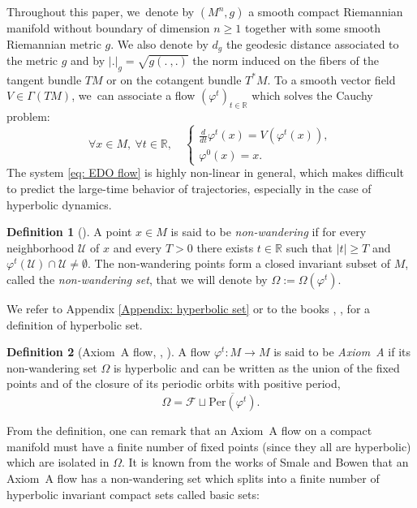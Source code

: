 \documentclass[JEP,XML,SOM,Unicode,NoEqCountersInSection,NoFloatCountersInSection,published]{cedram}
\let\dpl\displaystyle
\theoremstyle{definition}
\newtheorem{definition}{Definition}[section]
\theoremstyle{plain}
\newcommand{\Fcal}{\mathcal{F}}
\newcommand{\R}{\mathbb{R}}
\newcommand{\Ucal}{\mathcal{U}}
\newcommand{\dt}{\frac{d}{dt}}
\begin{document}
Throughout this paper, we~denote by $(M^n,g)$ a smooth compact Riemannian manifold without boundary of dimension $n\geq 1$ together with some smooth Riemannian metric $g$. We also denote by $d_g$ the geodesic distance associated to the metric $g$ and by $|.|_g = \sqrt{g(. \:,.)}$ the norm induced on the fibers of the tangent bundle $TM$ or on the cotangent bundle $T^*M$. To a smooth vector field $V \in \Gamma (TM)$, we~can associate a flow $(\varphi^t)_{t \in \R}$ which solves the Cauchy problem:
\begin{equation}\label{eq: EDO flow}
\forall x \in M, \: \forall t \in \R, \quad
\left\{
\begin{array}{ll}
\dpl\dt \varphi^t (x) = V (\varphi^t (x)), \\[6pt]
\varphi^0 (x) = x.
\end{array}
\right.
\end{equation}
The system \eqref{eq: EDO flow} is highly non-linear in general, which makes difficult to predict the large-time behavior of trajectories, especially in the case of hyperbolic dynamics.

\begin{definition}[{\cite[p.\,796]{smale}}]
A point $x \in M$ is said to be \emph{non-wandering} if for every neighborhood $\Ucal$ of $x$ and every $T > 0$ there exists $t \in \R$ such that $|t| \geq T$ and $\varphi^t (\Ucal) \cap \Ucal \neq \emptyset$. The non-wandering points form a closed invariant subset of $M$, called the \emph{non-wandering set}, that we will denote by $\Omega:= \Omega (\varphi^t)$.
\end{definition}

We refer to Appendix \ref{Appendix: hyperbolic set} or to the books \cite{palis-demelo}, \cite{katok-hasselblatt}, \cite{FH} for a definition of hyperbolic set.

\begin{definition}[{Axiom~A flow, \cite[p.\,803]{smale}, \cite[Def.\,5.3.29]{FH}}]
A flow $\varphi^t: M \to M$ is said to be \emph{Axiom~A} if its non-wandering set $\Omega$ is hyperbolic and can be written as the union of the fixed points and of the closure of its periodic orbits with positive period, \ie\vspace*{-3pt}
\[
\Omega = \Fcal \sqcup \overline{\mathrm{Per} (\varphi^t)}.
\]
\end{definition}

From the definition, one can remark that an Axiom~A flow on a compact manifold must have a finite number of fixed points (since they all are hyperbolic) which are isolated in $\Omega$. It is known from the works of Smale and Bowen that an Axiom~A flow has a non-wandering set which splits into a finite number of hyperbolic invariant compact sets called basic sets:
\end{document}
